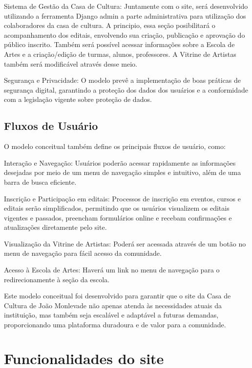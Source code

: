 Sistema de Gestão da Casa de Cultura: Juntamente com o site, será desenvolvido utilizando a ferramenta Django admin a parte administrativa para utilização dos colaboradores da casa de cultura. A principio, essa seção posibilitará o acompanhamento dos editais, envolvendo sua criação, publicação e aprovação do público inscrito. Também será possível acessar informações sobre a Escola de Artes e a criação/edição de turmas, alunos, professores. A Vitrine de Artistas também será modificável através desse meio.

Segurança e Privacidade: O modelo prevê a implementação de boas práticas de segurança digital, garantindo a proteção dos dados dos usuários e a conformidade com a legislação vigente sobre proteção de dados.

\subsection{Fluxos de Usuário}

O modelo conceitual também define os principais fluxos de usuário, como:

Interação e Navegação: Usuários poderão acessar rapidamente as informações desejadas por meio de um menu de navegação simples e intuitivo, além de uma barra de busca eficiente.

Inscrição e Participação em editais: Processos de inscrição em eventos, cursos e editais serão simplificados, permitindo que os usuários visualizem os editais vigentes e passados, preencham formulários online e recebam confirmações e atualizações diretamente pelo site.

Visualização da Vitrine de Artistas: Poderá ser acessada através de um botão no menu de navegação para fácil acesso da comunidade.

Acesso à Escola de Artes: Haverá um link no menu de navegação para o redirecionamente à seção da escola.

Este modelo conceitual foi desenvolvido para garantir que o site da Casa de Cultura de João Monlevade não apenas atenda às necessidades atuais da instituição, mas também seja escalável e adaptável a futuras demandas, proporcionando uma plataforma duradoura e de valor para a comunidade.

\section{Funcionalidades do site}

